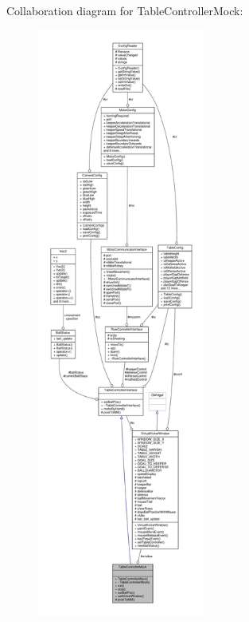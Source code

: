 Collaboration diagram for Table\+Controller\+Mock\+:\nopagebreak
\begin{figure}[H]
\begin{center}
\leavevmode
\includegraphics[height=550pt]{class_table_controller_mock__coll__graph}
\end{center}
\end{figure}
